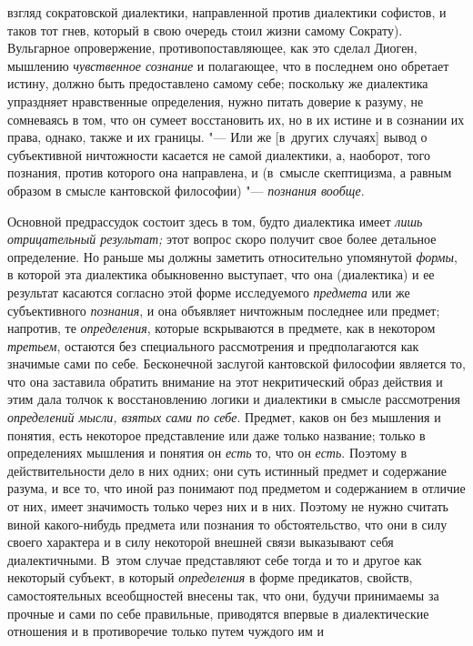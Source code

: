 взгляд сократовской диалектики, направленной против диалектики софистов, и
таков тот гнев, который в свою очередь стоил жизни самому Сократу).
Вульгарное опровержение, противопоставляющее, как это сделал Диоген,
мышлению {\em чувственное сознание}
и полагающее, что в последнем оно обретает истину, должно
быть предоставлено самому себе; поскольку же диалектика упраздняет
нравственные определения, нужно питать доверие к разуму, не сомневаясь в
том, что он сумеет восстановить их, но в их истине и в сознании их права,
однако, также и их границы. "--- Или же [в~других случаях]
вывод о субъективной ничтожности касается не самой диалектики, а, наоборот,
того познания, против которого она направлена, и (в~смысле скептицизма, а
равным образом в смысле кантовской философии) "--- {\em познания вообще}.

Основной предрассудок состоит здесь в том, будто диалектика
имеет {\em лишь отрицательный
результат;} этот вопрос скоро получит свое более детальное
определение. Но раньше мы должны заметить относительно упомянутой
{\em формы}, в которой
эта диалектика обыкновенно выступает, что она (диалектика) и ее результат
касаются согласно этой форме исследуемого {\em предмета} или же
субъективного {\em познания}, и она объявляет ничтожным последнее или
предмет; напротив, те {\em определения},
которые вскрываются в предмете, как в некотором {\em третьем}, остаются
без специального рассмотрения и предполагаются как значимые сами по себе.
\label{bkm:bm126a}Бесконечной заслугой кантовской философии
является то, что она заставила обратить внимание на этот некритический
образ действия и этим дала толчок к восстановлению логики и диалектики в
смысле рассмотрения {\em определений
мысли, взятых сами по себе}. Предмет, каков он без мышления
и понятия, есть некоторое представление или даже только название; только в
определениях мышления и понятия он {\em есть} то, что он {\em есть}. Поэтому
в действительности дело в них одних; они суть истинный предмет и содержание
разума, и все то, что иной раз понимают под предметом и содержанием в
отличие от них, имеет значимость только через них и в них. Поэтому не нужно
считать виной какого-нибудь предмета или познания то обстоятельство, что
они в силу своего характера и в силу некоторой внешней связи выказывают
себя диалектичными. В~этом случае представляют себе тогда и то и другое как
некоторый субъект, в который {\em определения} в форме
предикатов, свойств, самостоятельных всеобщностей внесены так, что они,
будучи принимаемы за прочные и сами по себе правильные, приводятся впервые
в диалектические отношения и в противоречие только путем чуждого им и
